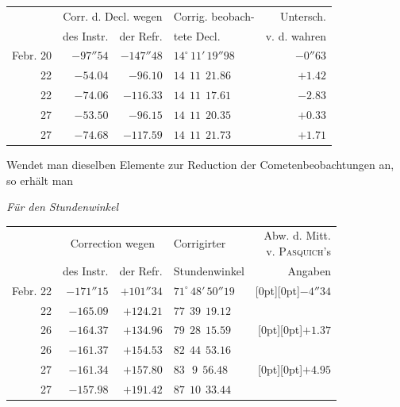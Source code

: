\begin{center}\footnotesize\setlength{\tabcolsep}{4pt}
\begin{tabular}{r|r|r|l|r}
 & \multicolumn{2}{c|}{Corr. d. Decl. wegen} & Corrig. beobach- & Untersch.\\
 & des Instr. & der Refr. & tete Decl. & v. d. wahren \\
\hline
Febr. 20 & $-97''54$ & $-147''48$ & $14^\circ\,11'\,19''98$ & $-0''63$ \\
22 & $-54.04$ & $-96.10$ & $14\ \ 11\ \ 21.86$ & $+1.42$ \\
22 & $-74.06$ & $-116.33$ & $14\ \ 11\ \ 17.61$ & $-2.83$ \\
27 & $-53.50$ & $-96.15$ & $14\ \ 11\ \ 20.35$ & $+0.33$ \\
27 & $-74.68$ & $-117.59$ & $14\ \ 11\ \ 21.73$ & $+1.71$ \\
\end{tabular}
\end{center}

Wendet man dieselben Elemente zur Reduction der Cometenbeobachtungen an, so erhält
man

\begin{center}\footnotesize\setlength{\tabcolsep}{4pt}
\emph{Für den Stundenwinkel}
\end{center}

\begin{center}\footnotesize\setlength{\tabcolsep}{4pt}
\begin{tabular}{r|r|r|l|r}
 & \multicolumn{2}{c|}{Correction wegen} & Corrigirter & \shortstack{Abw. d. Mitt.\\v. \textsc{Pasquich}'s}\\
 & des Instr. & der Refr. & Stundenwinkel & Angaben \\
\hline
Febr. 22 & $-171''15$ & $+101''34$ & $71^\circ\,48'\,50''19$ & \raisebox{-5.5pt}[0pt][0pt]{$-4''34$} \\
22 & $-165.09$ & $+124.21$ & $77\ \ 39\ \ 19.12$ & \\
26 & $-164.37$ & $+134.96$ & $79\ \ 28\ \ 15.59$ & \raisebox{-5.5pt}[0pt][0pt]{$+1.37$} \\
26 & $-161.37$ & $+154.53$ & $82\ \ 44\ \ 53.16$ & \\
27 & $-161.34$ & $+157.80$ & $83\ \ \ 9\ \ 56.48$ & \raisebox{-5.5pt}[0pt][0pt]{$+4.95$} \\
27 & $-157.98$ & $+191.42$ & $87\ \ 10\ \ 33.44$ & \\
\end{tabular}
\end{center}


